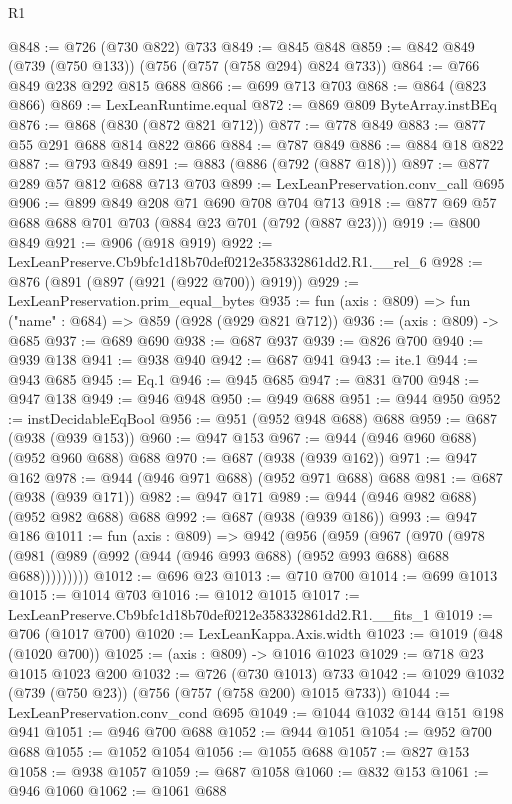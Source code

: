 \begin{lexlean}{R1}
\begin{coremodule}
@848 := @726 (@730 @822) @733
@849 := @845 @848
@859 := @842 @849 (@739 (@750 @133)) (@756 (@757 (@758 @294) @824 @733))
@864 := @766 @849 @238 @292 @815 @688
@866 := @699 @713 @703
@868 := @864 (@823 @866)
@869 := LexLeanRuntime.equal
@872 := @869 @809 ByteArray.instBEq
@876 := @868 (@830 (@872 @821 @712))
@877 := @778 @849
@883 := @877 @55 @291 @688 @814 @822 @866
@884 := @787 @849
@886 := @884 @18 @822
@887 := @793 @849
@891 := @883 (@886 (@792 (@887 @18)))
@897 := @877 @289 @57 @812 @688 @713 @703
@899 := LexLeanPreservation.conv_call @695
@906 := @899 @849 @208 @71 @690 @708 @704 @713
@918 := @877 @69 @57 @688 @688 @701 @703 (@884 @23 @701 (@792 (@887 @23)))
@919 := @800 @849
@921 := @906 (@918 @919)
@922 := LexLeanPreserve.Cb9bfc1d18b70def0212e358332861dd2.R1.__rel_6
@928 := @876 (@891 (@897 (@921 (@922 @700)) @919))
@929 := LexLeanPreservation.prim_equal_bytes
@935 := fun (axis : @809) => fun ("name" : @684) => @859 (@928 (@929 @821 @712))
@936 := (axis : @809) -> @685
@937 := @689 @690
@938 := @687 @937
@939 := @826 @700
@940 := @939 @138
@941 := @938 @940
@942 := @687 @941
@943 := ite.{1}
@944 := @943 @685
@945 := Eq.{1}
@946 := @945 @685
@947 := @831 @700
@948 := @947 @138
@949 := @946 @948
@950 := @949 @688
@951 := @944 @950
@952 := instDecidableEqBool
@956 := @951 (@952 @948 @688) @688
@959 := @687 (@938 (@939 @153))
@960 := @947 @153
@967 := @944 (@946 @960 @688) (@952 @960 @688) @688
@970 := @687 (@938 (@939 @162))
@971 := @947 @162
@978 := @944 (@946 @971 @688) (@952 @971 @688) @688
@981 := @687 (@938 (@939 @171))
@982 := @947 @171
@989 := @944 (@946 @982 @688) (@952 @982 @688) @688
@992 := @687 (@938 (@939 @186))
@993 := @947 @186
@1011 := fun (axis : @809) =>
  @942
    (@956
      (@959
        (@967
          (@970 (@978 (@981 (@989 (@992 (@944 (@946 @993 @688) (@952 @993 @688) @688 @688)))))))))
@1012 := @696 @23
@1013 := @710 @700
@1014 := @699 @1013
@1015 := @1014 @703
@1016 := @1012 @1015
@1017 := LexLeanPreserve.Cb9bfc1d18b70def0212e358332861dd2.R1.__fits_1
@1019 := @706 (@1017 @700)
@1020 := LexLeanKappa.Axis.width
@1023 := @1019 (@48 (@1020 @700))
@1025 := (axis : @809) -> @1016 @1023
@1029 := @718 @23 @1015 @1023 @200
@1032 := @726 (@730 @1013) @733
@1042 := @1029 @1032 (@739 (@750 @23)) (@756 (@757 (@758 @200) @1015 @733))
@1044 := LexLeanPreservation.conv_cond @695
@1049 := @1044 @1032 @144 @151 @198 @941
@1051 := @946 @700 @688
@1052 := @944 @1051
@1054 := @952 @700 @688
@1055 := @1052 @1054
@1056 := @1055 @688
@1057 := @827 @153
@1058 := @938 @1057
@1059 := @687 @1058
@1060 := @832 @153
@1061 := @946 @1060
@1062 := @1061 @688

\end{coremodule}
\end{lexlean}
